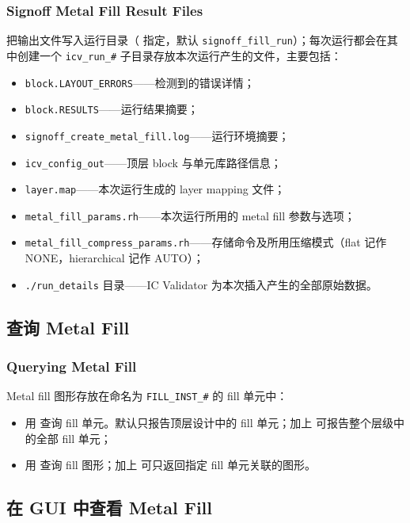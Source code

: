 \subsubsection*{Signoff Metal Fill Result Files}

 把输出文件写入运行目录（ 指定，默认 \texttt{signoff\_fill\_run}）；每次运行都会在其中创建一个 \texttt{icv\_run\_\#} 子目录存放本次运行产生的文件，主要包括：
\begin{itemize}
  \item \texttt{block.LAYOUT\_ERRORS}——检测到的错误详情；
  \item \texttt{block.RESULTS}——运行结果摘要；
  \item \texttt{signoff\_create\_metal\_fill.log}——运行环境摘要；
  \item \texttt{icv\_config\_out}——顶层 block 与单元库路径信息；
  \item \texttt{layer.map}——本次运行生成的 layer mapping 文件；
  \item \texttt{metal\_fill\_params.rh}——本次运行所用的 metal fill 参数与选项；
  \item \texttt{metal\_fill\_compress\_params.rh}——存储命令及所用压缩模式（flat 记作 NONE，hierarchical 记作 AUTO）；
  \item \texttt{./run\_details} 目录——IC Validator 为本次插入产生的全部原始数据。
\end{itemize}

\subsection{查询 Metal Fill}
\subsubsection*{Querying Metal Fill}

Metal fill 图形存放在命名为 \texttt{FILL\_INST\_\#} 的 fill 单元中：
\begin{itemize}
  \item 用  查询 fill 单元。默认只报告顶层设计中的 fill 单元；加上  可报告整个层级中的全部 fill 单元；
  \item 用  查询 fill 图形；加上  可只返回指定 fill 单元关联的图形。
\end{itemize}

\subsection{在 GUI 中查看 Metal Fill}
